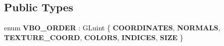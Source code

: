 \subsection*{Public Types}
\begin{DoxyCompactItemize}
\item 
\mbox{\label{classprz_1_1_mesh_a92ede8aab760d6591edcead3136b4ed8}} 
enum {\bfseries V\+B\+O\+\_\+\+O\+R\+D\+ER} \+: G\+Luint \{ \newline
{\bfseries C\+O\+O\+R\+D\+I\+N\+A\+T\+ES}, 
{\bfseries N\+O\+R\+M\+A\+LS}, 
{\bfseries T\+E\+X\+T\+U\+R\+E\+\_\+\+C\+O\+O\+RD}, 
{\bfseries C\+O\+L\+O\+RS}, 
\newline
{\bfseries I\+N\+D\+I\+C\+ES}, 
{\bfseries S\+I\+ZE}
 \}
\end{DoxyCompactItemize}
